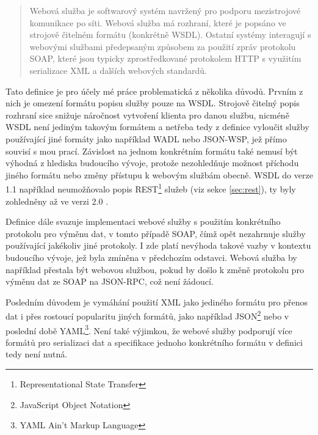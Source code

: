 \documentclass[czech,DP]{thesiskiv}
\begin{document}
\begin{quote}
	Webová služba je softwarový systém navržený pro podporu mezistrojové komunikace po síti. Webová služba má rozhraní, které je popsáno ve strojově čitelném formátu (konkrétně WSDL). Ostatní systémy interagují s webovými službami předepsaným způsobem za použití zpráv protokolu SOAP, které jsou typicky zprostředkované protokolem HTTP s využitím serializace XML a dalších webových standardů.
\end{quote}


Tato definice je pro účely mé práce problematická z několika důvodů. Prvním z nich je omezení formátu popisu služby pouze na WSDL. Strojově čitelný popis rozhraní sice snižuje náročnost vytvoření klienta pro danou službu, nicméně WSDL není jediným takovým formátem a netřeba tedy z definice vyloučit služby používající jiné formáty jako například WADL nebo JSON-WSP, jež přímo souvisí s mou prací. Závislost na jednom konkrétním formátu také nemusí být výhodná z hlediska budoucího vývoje, protože nezohledňuje možnost příchodu jiného formátu nebo změny přístupu k webovým službám obecně. WSDL do verze 1.1 například neumožňovalo popis REST\footnote{Representational State Transfer} služeb (viz sekce \ref{sec:rest}), ty byly zohledněny až ve verzi 2.0 \cite{restWsdl}.  

Definice dále svazuje implementaci webové služby s použitím konkrétního protokolu pro výměnu dat, v tomto případě SOAP, čímž opět nezahrnuje služby používající jakékoliv jiné protokoly. I zde platí nevýhoda takové vazby v kontextu budoucího vývoje, jež byla zmíněna v předchozím odstavci. Webová služba by například přestala být webovou službou, pokud by došlo k změně protokolu pro výměnu dat ze SOAP na JSON-RPC, což není žádoucí.

Posledním důvodem je vymáhání použití XML jako jediného formátu pro přenos dat i přes rostoucí popularitu jiných formátů, jako například JSON\footnote{JavaScript Object Notation} nebo v poslední době YAML\footnote{YAML Ain't Markup Language}. Není také výjimkou, že webové služby podporují více formátů pro serializaci dat a specifikace jednoho konkrétního formátu v definici tedy není nutná. 
\end{document}
